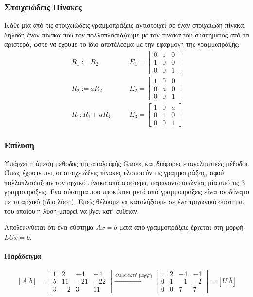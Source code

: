\documentclass[11pt,a4paper,notitlepage,fleqn,final]{article}
\begin{document}
\begin{itemize}
	\subsubsection{Στοιχειώδεις Πίνακες}
	Κάθε μία από τις στοιχειώδεις γραμμοπράξεις αντιστοιχεί σε έναν
	στοιχειώδη πίνακα, δηλαδή έναν πίνακα που τον πολλαπλασιάζουμε με
	τον πίνακα του συστήματος από τα αριστερά, ώστε να έχουμε το ίδιο
	αποτέλεσμα με την εφαρμογή της γραμμοπράξης:
	\begin{align*}
		R_1 := R_2 &\qquad E_1 = \left[\begin{matrix}
		0&1&0\\1&0&0\\0&0&1
		\end{matrix}\right] \\
		R_2 := aR_2 &\qquad E_2 = \left[\begin{matrix}
		1&0&0\\0&a&0\\0&0&1
		\end{matrix}\right] \\
		R_1 : R_1+aR_3 &\qquad E_3=\left[\begin{matrix}
		1&0&a\\0&1&0\\0&0&1
		\end{matrix}\right]
	\end{align*}
\end{itemize}

\subsubsection{Επίλυση}
Υπάρχει η άμεση μέθοδος της απαλοιφής Gauss, και διάφορες επαναληπτικές
μέθοδοι. Όπως έχουμε πει, οι στοιχειώδεις πίνακες υλοποιούν τις
γραμμοπράξεις, αφού πολλαπλασιάζουν τον αρχικό πίνακα από αριστερά,
παραγοντοποιώντας μία από τις 3 γραμμοπράξεις. Ένα σύστημα που προκύπτει
μετά από γραμμοπράξεις είναι ισοδύναμο με το αρχικό (ίδια λύση). Εμείς
θέλουμε να καταλήξουμε σε ένα τριγωνικό σύστημα, του οποίου η λύση
μπορεί να βγει κατ' ευθείαν.

Αποδεικνύεται ότι ένα σύστημα \( Ax=b \) μετά από γραμμοπράξεις
έρχεται στη μορφή \( LUx = b \).

\paragraph{Παράδειγμα}
\[
[A|b] = \left[\begin{array}{ccc|c}
1&2&-4&-4\\5&11&-21&-22\\3&-2&3&11
\end{array}\right]
\xrightarrow{\text{κλιμακωτή μορφή}}
\left[\begin{matrix}
1&2&-4&-4\\0&1&-1&-2\\0&0&7&7
\end{matrix}\right] = [U|\bar b]
\]
\end{document}
